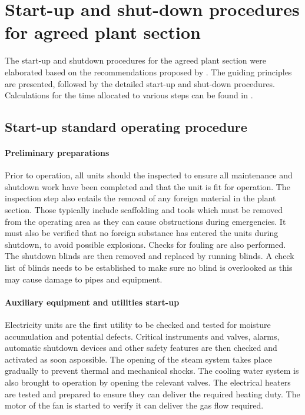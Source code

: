 \section{Start-up and shut-down procedures for agreed plant section}
The start-up and shutdown procedures for the agreed plant section were elaborated based on the recommendations proposed by \textcite{}. The guiding principles are presented, followed by the detailed start-up and shut-down procedures. Calculations for the time allocated to various steps can be found in .

\subsection{Start-up standard operating procedure}

\paragraph{Preliminary preparations}
Prior to operation, all units should the inspected to ensure all maintenance and shutdown work have been completed and that the unit is fit for operation. The inspection step also entails the removal of any foreign material in the plant section. Those typically include scaffolding and tools which must be removed from the operating area as they can cause obstructions during emergencies. It must also be verified that no foreign substance has entered the units during shutdown, to avoid possible explosions. Checks for fouling are also performed. The shutdown blinds are then removed and replaced by running blinds. A check list of blinds needs to be established to make sure no blind is overlooked as this may cause damage to pipes and equipment.



\paragraph{Auxiliary equipment and utilities start-up}

Electricity units are the first utility to be checked and tested for moisture accumulation and potential defects. Critical instruments and valves, alarms, automatic shutdown devices and other safety features are then checked and activated as soon aspossible.
The opening of the steam system takes place gradually to prevent thermal and mechanical shocks. The cooling water system is also brought to operation by opening the relevant valves. The electrical heaters are tested and prepared to ensure they can deliver the required heating duty. The motor of the fan is started to verify it can deliver the gas flow required. 

